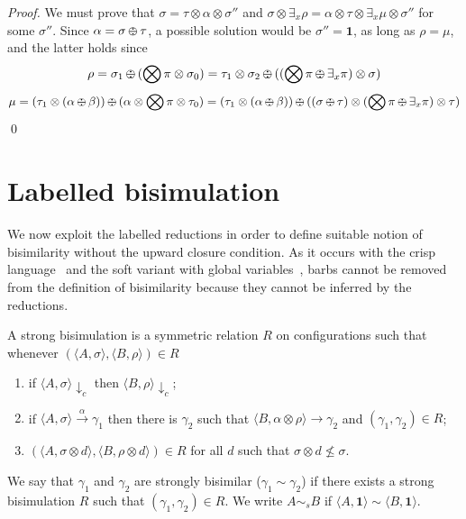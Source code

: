 \documentclass{llncs}
\def\monid{{\mathbf 0}}
\def\odiv{\, {\ominus\hspace{-7.7pt} \div} \,}
\def\monid{\mathbf{1}}
\begin{document}
\begin{proof}
{\noindent
We must prove that $\sigma = \tau \otimes \alpha \otimes \sigma''$ and 
$\sigma \otimes \exists_x \rho = \alpha \otimes \tau \otimes \exists_x \mu \otimes \sigma''$ for some $\sigma''$.
Since $\alpha = \sigma \odiv \tau$, a possible solution would be $\sigma'' = \monid$,
as long as $\rho = \mu$,
and the latter holds since
$$\rho = \sigma_1 \odiv (\bigotimes \pi  \otimes \sigma_0) = \tau_1 \otimes \sigma_2 \odiv ((\bigotimes \pi  \odiv \exists_x \pi) \otimes \sigma)$$
$$\mu = (\tau_1 \otimes (\alpha \odiv \beta)) \odiv (\alpha \otimes \bigotimes \pi  \otimes \tau_0) = 
(\tau_1 \otimes (\alpha \odiv \beta)) \odiv ((\sigma \odiv \tau) \otimes (\bigotimes \pi  \odiv \exists_x \pi)  \otimes \tau)$$
}
\qed
\end{proof}


\section{Labelled bisimulation}
We now exploit the labelled reductions in order to define suitable notion of bisimilarity without the upward closure condition.
As it occurs with the crisp language~\cite{pippo} and the soft variant with global variables~\cite{festcatuscia}, 
barbs cannot be removed from the 
definition of bisimilarity because they cannot be inferred by the reductions.

\begin{definition}\label{def:strongbis} A strong bisimulation is a symmetric relation $R$ on configurations such that whenever
$( \langle A, \sigma \rangle,\langle B, \rho \rangle) \in R$
\begin{enumerate}
\item if $\langle A, \sigma \rangle \downarrow_c$ then $\langle B, \rho \rangle \downarrow_c$;
\item if $\langle A, \sigma \rangle \xrightarrow{\alpha} \gamma_1$ then there is $\gamma_2$ such that $\langle B, \alpha \otimes \rho \rangle \to \gamma_2$ 
and $(\gamma_1, \gamma_2) \in R$;
\item $(\langle A,\sigma \otimes d\rangle, \langle B,\rho \otimes d \rangle) \in R$ for  all $d$ such that $\sigma \otimes d \not \leq \sigma$. 
\end{enumerate}
We say that $\gamma_1$ and $\gamma_2$ are  strongly bisimilar ($\gamma_1  \sim \gamma_2$) if there exists a strong  bisimulation 
$R$ such that $(\gamma_1 , \gamma_2 ) \in R$. We write $A \sim_{\mathit{s}} B$ if $\langle A, \monid \rangle \sim \langle B, \monid \rangle$.
\end{definition}
\end{document}
